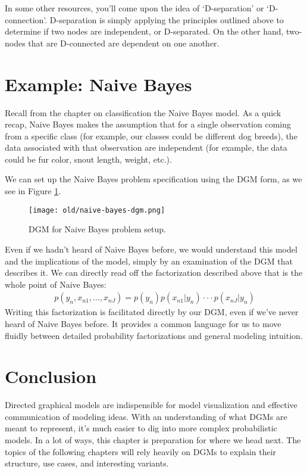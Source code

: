 \begin{warning}
    In some other resources, you'll come upon the idea of `D-separation' or `D-connection'. D-separation is simply applying the principles outlined above to determine if two nodes are independent, or D-separated. On the other hand, two-nodes that are D-connected are dependent on one another.
\end{warning}

\section{Example: Naive Bayes}
Recall from the chapter on classification the Naive Bayes model. As a quick recap, Naive Bayes makes the assumption that for a single observation coming from a specific class (for example, our classes could be different dog breeds), the data associated with that observation are independent (for example, the data could be fur color, snout length, weight, etc.).

We can set up the Naive Bayes problem specification using the DGM form, as we see in Figure \ref{fig:naive-bayes}.
\begin{figure}
	\centering
	\texttt{[image: old/naive-bayes-dgm.png]}
    \caption{DGM for Naive Bayes problem setup.}
	\label{fig:naive-bayes}
\end{figure}

Even if we hadn't heard of Naive Bayes before, we would understand this model and the implications of the model, simply by an examination of the DGM that describes it. We can directly read off the factorization described above that is the whole point of Naive Bayes:
\begin{align*}
	p(y_n, x_{n1}, ..., x_{nJ}) = p(y_n) p(x_{n1} | y_n) \cdot \cdot \cdot p(x_{nJ} | y_n)
\end{align*}
Writing this factorization is facilitated directly by our DGM, even if we've never heard of Naive Bayes before. It provides a common language for us to move fluidly between detailed probability factorizations and general modeling intuition.

\section{Conclusion}
Directed graphical models are indispensible for model visualization and effective communication of modeling ideas. With an understanding of what DGMs are meant to represent, it's much easier to dig into more complex probabilistic models. In a lot of ways, this chapter is preparation for where we head next. The topics of the following chapters will rely heavily on DGMs to explain their structure, use cases, and interesting variants.